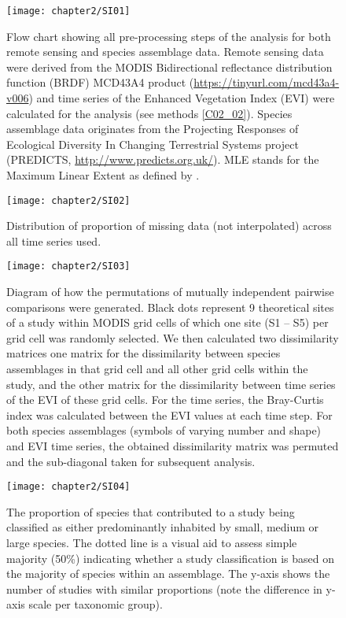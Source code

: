 \begin{figure}[htb]
\centering
\texttt{[image: chapter2/SI01]}
\caption{Flow chart showing all pre-processing steps of the analysis for both remote sensing and species assemblage data. Remote sensing data were derived from the MODIS Bidirectional reflectance distribution function (BRDF) MCD43A4 product (\href{https://tinyurl.com/mcd43a4-v006}{https://tinyurl.com/mcd43a4-v006}) and time series of the Enhanced Vegetation Index (EVI) were calculated for the analysis (see methods \ref{C02_02}). Species assemblage data originates from the Projecting Responses of Ecological Diversity In Changing Terrestrial Systems project (PREDICTS, \href{http://www.predicts.org.uk/}{http://www.predicts.org.uk/}). MLE stands for the Maximum Linear Extent as defined by \citep{Hudson2016}.}
\label{SI02_01}
\end{figure}

\begin{figure}[htb]
\centering
\texttt{[image: chapter2/SI02]}
\caption{ Distribution of proportion of missing data (not interpolated) across all time series used. }
\label{SI02_02}
\end{figure}

\begin{figure}[htb]
\centering
\texttt{[image: chapter2/SI03]}
\caption{ Diagram of how the permutations of mutually independent pairwise comparisons were generated. Black dots represent 9 theoretical sites of a study within MODIS grid cells of which one site (S1 – S5) per grid cell was randomly selected. We then calculated two dissimilarity matrices one matrix for the dissimilarity between species assemblages in that grid cell and all other grid cells within the study, and the other matrix for the dissimilarity between time series of the EVI of these grid cells.  For the time series, the Bray-Curtis index was calculated between the EVI values at each time step. For both species assemblages (symbols of varying number and shape) and EVI time series, the obtained dissimilarity matrix was permuted and the sub-diagonal taken for subsequent analysis. }
\label{SI02_03}
\end{figure}

\begin{figure}[htb]
\centering
\texttt{[image: chapter2/SI04]}
\caption{ The proportion of species that contributed to a study being classified as either predominantly inhabited by small, medium or large species. The dotted line is a visual aid to assess simple majority (50\%) indicating whether a study classification is based on the majority of species within an assemblage. The y-axis shows the number of studies with similar proportions (note the difference in y-axis scale per taxonomic group). }
\label{SI02_04}
\end{figure}

